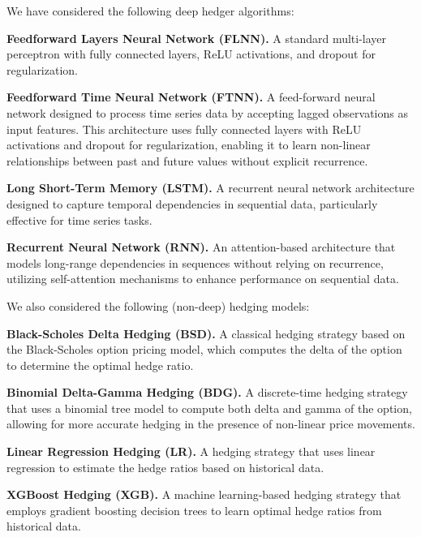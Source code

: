 \documentclass[sigconf]{acmart}
\begin{document}
      We have considered the following deep hedger algorithms:
      \begin{enumerate}[label=\textbf{[H\arabic*]}]
        \item \label{hedger:feedforwardlag} \textbf{Feedforward Layers
        Neural 
        Network (FLNN).} A standard multi-layer perceptron with 
        fully connected layers, ReLU activations, and dropout for 
        regularization.

        \item \label{hedger:feedforward} \textbf{Feedforward Time
        Neural Network (FTNN).} A feed-forward neural network designed 
          to process time series data by accepting lagged observations 
          as input features. This architecture uses fully connected 
          layers with ReLU activations and dropout for regularization, 
          enabling it to learn non-linear relationships between past 
          and future values without explicit recurrence.
        
        \item \label{hedger:lstm} \textbf{Long Short-Term Memory 
        (LSTM).} A recurrent neural network architecture designed 
        to capture temporal dependencies in sequential data, 
        particularly effective for time series tasks.
        
        \item \label{hedger:rnn} \textbf{Recurrent Neural Network (RNN).}
        An attention-based architecture that models long-range 
        dependencies in sequences without relying on recurrence, 
        utilizing self-attention mechanisms to enhance performance 
        on sequential data.
      
      \end{enumerate}
    
    We also considered the following (non-deep) hedging models:
    \begin{enumerate}[label=\textbf{[H\arabic*]}, resume]
      \item \label{hedger:black-scholes} \textbf{Black-Scholes 
      Delta Hedging (BSD).} A classical hedging strategy based on the 
      Black-Scholes option pricing model, which computes the 
      delta of the option to determine the optimal hedge ratio.

      \item \label{hedger:binomial} \textbf{Binomial Delta-Gamma Hedging (BDG).}
      A discrete-time hedging strategy that uses a binomial tree
      model to compute both delta and gamma of the option, allowing
      for more accurate hedging in the presence of non-linear price
      movements.

      \item \label{hedger:lreg} \textbf{Linear Regression Hedging (LR).} 
      A hedging strategy that uses linear regression to estimate 
      the hedge ratios based on historical data.

      \item \label{hedger:xgboost} \textbf{XGBoost Hedging (XGB).}
      A machine learning-based hedging strategy that employs
      gradient boosting decision trees to learn optimal hedge ratios
      from historical data.  
    \end{enumerate}
\end{document}
